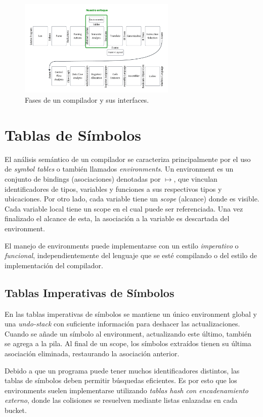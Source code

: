 \documentclass[runningheads]{llncs}
\begin{document}
\begin{figure}[H]
    \centering
    \includegraphics[width=7.5cm]{fases-compilador.png}
    \caption{Fases de un compilador y sus interfaces.}
    \label{fig:fases-compilador}
\end{figure}

\section{Tablas de Símbolos}
El análisis semántico de un compilador se caracteriza principalmente por el uso de \textit{symbol tables} o también llamados \textit{environments}. Un environment es un conjunto de bindings (asociaciones) denotadas por $\mapsto$, que vinculan identificadores de tipos, variables y funciones a sus respectivos tipos y ubicaciones. Por otro lado, cada variable tiene un \textit{scope} (alcance) donde es visible. Cada variable local tiene un scope en el cual puede ser referenciada. Una vez finalizado el alcance de esta, la asociación a la variable es descartada del environment.

El manejo de environments puede implementarse con un estilo \textit{imperativo} o \textit{funcional}, independientemente del lenguaje que se esté compilando o del estilo de implementación del compilador.

\subsection{Tablas Imperativas de Símbolos}
En las tablas imperativas de símbolos se mantiene un único environment global y una \textit{undo-stack} con suficiente información para deshacer las actualizaciones. Cuando se añade un símbolo al environment, actualizando este último, también se agrega a la pila. Al final de un scope, los símbolos extraídos tienen su última asociación eliminada, restaurando la asociación anterior.

Debido a que un programa puede tener muchos identificadores distintos, las tablas de símbolos deben permitir búsquedas eficientes. Es por esto que los environments suelen implementarse utilizando \textit{tablas hash con encadenamiento externo}, donde las colisiones se resuelven mediante listas enlazadas en cada bucket. 
\end{document}

